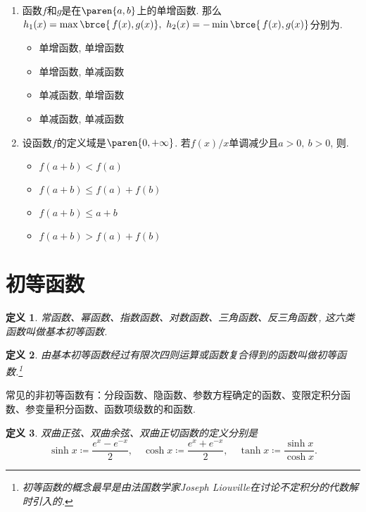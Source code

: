 \documentclass[a4paper,punct=CCT]{ctexbook}
\theoremstyle{break}
\newtheorem*{definition*}{定义}
\newif\ifshowsol
\let\leq\leqslant
\let\le\leq
\begin{document}
\begin{enumerate}
\item 函数\(f\)和\(g\)是在\(\paren{a,b}\)上的单增函数.  那么\(h_1(x) = \max\brce{\,f(x), g(x)},\ h_2(x) = -\min\brce{\,f(x), g(x)}\)分别为\uline{\makebox[6em]{}}.
  \begin{itemize}
    \renewcommand{\labelitemi}{\faCircleThin}
  \item 单增函数, 单增函数
    \ifshowsol
  \item[\faCircle] 单增函数, 单减函数
    \else
  \item 单增函数, 单减函数
    \fi
  \item 单减函数, 单增函数
  \item 单减函数, 单减函数
  \end{itemize}

\item 设函数\(f\)的定义域是\(\paren{0,+\infty}\).  若\(f(x)/x\)单调减少且\(a > 0,\ b > 0\), 则\uline{\makebox[6em]{}}.
  \begin{itemize}
    \renewcommand{\labelitemi}{\faCircleThin}
  \item \(f(a+b) < f(a)\)
    \ifshowsol
  \item[\faCircle] \(f(a+b) \le f(a) + f(b)\)
    \else
  \item \(f(a+b) \le f(a) + f(b)\)
    \fi
  \item \(f(a+b) \le a + b\)
  \item \(f(a+b) > f(a) + f(b)\)
  \end{itemize}
\end{enumerate}
\fi

\section{初等函数}

\begin{definition*}
  常函数、幂函数、指数函数、对数函数、三角函数、反三角函数\,, 这六类函数叫做基本初等函数.
\end{definition*}

\begin{definition*}
  由基本初等函数经过有限次四则运算或函数复合得到的函数叫做初等函数.\footnote{初等函数的概念最早是由法国数学家Joseph Liouville在讨论不定积分的代数解时引入的.}
\end{definition*}

常见的非初等函数有：分段函数、隐函数、参数方程确定的函数、变限定积分函数、参变量积分函数、函数项级数的和函数.

\begin{definition*}
  双曲正弦、双曲余弦、双曲正切函数的定义分别是
  \[
    \sinh x \coloneq \frac{e^x-e^{-x}}{2},
    \quad
    \cosh x \coloneq \frac{e^x+e^{-x}}{2},
    \quad
    \tanh x \coloneq \frac{\sinh x}{\cosh x}.
  \]
\end{definition*}
\pagebreak
\end{document}
